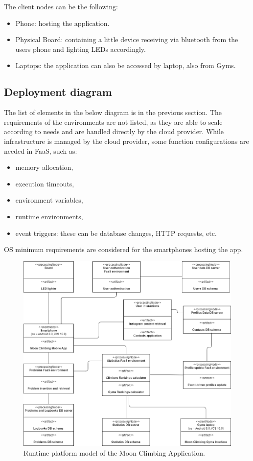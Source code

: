 \documentclass{article}
\begin{document}
The client nodes can be the following:
\begin{itemize}
    \item Phone: hosting the application.
    \item Physical Board: containing a little device receiving via bluetooth from the users phone and lighting LEDs accordingly.
    \item Laptops: the application can also be accessed by laptop, also from Gyms.
\end{itemize}

\subsection{Deployment diagram}

The list of elements in the below diagram is in the previous section. The requirements of the environments are not listed, as they are able to scale according to needs and are handled directly by the cloud provider.
While infrastructure is managed by the cloud provider, some function configurations are needed in FaaS, such as:
\begin{itemize}
    \item memory allocation,
    \item execution timeouts,
    \item environment variables,
    \item runtime environments,
    \item event triggers: these can be database changes, HTTP requests, etc.
\end{itemize}

OS minimum requirements are considered for the smartphones hosting the app.

\begin{figure}[H]
    \centering
    \includegraphics[width=\textwidth]{deployment_UML.png}
    \caption{Runtime platform model of the Moon Climbing Application.}
    \label{fig:trip_system}
\end{figure}
\end{document}
